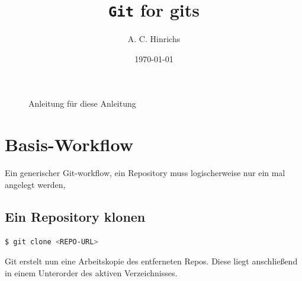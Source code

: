 \documentclass[landscape,a4paper]{cheatsheet}
\title{\texttt{Git} for gits}
\author{A. C. Hinrichs}
\date{\today}
\newcommand{\highlight}[1]{{\textsf{\color{primaryColor}#1}}}
\begin{document}
\maketitle

\begin{figure}[H]
  \centering
  \caption{Anleitung für diese Anleitung\protect\footnotemark}
  \label{fig:anleitung}
\end{figure}
\section{Basis-Workflow}
Ein generischer Git-workflow, ein \highlight{Repository} muss
logischerweise nur ein mal angelegt werden, 
\subsection{Ein \highlight{Repository} klonen}
\begin{lstlisting}[language=bash]
  $ git clone <REPO-URL>
\end{lstlisting} %
Git erstelt nun eine \highlight{Arbeitskopie} des entferneten
Repos. Diese liegt anschließend in einem Unterorder des aktiven
Verzeichnisses. 
\end{document}
